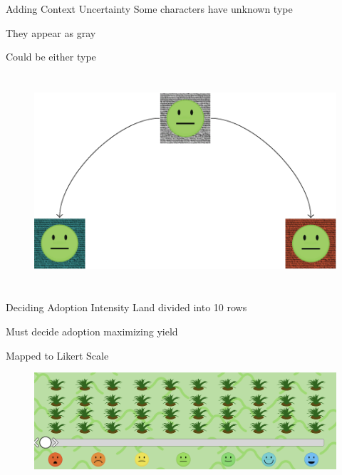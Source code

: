\documentclass[
  ignorenonframetext,
]{beamer}
\begin{document}
\begin{frame}{Adding Context Uncertainty}
\protect\hypertarget{adding-context-uncertainty}{}
Some characters have unknown type

They appear as gray

Could be either type

\begin{figure}

{\centering \includegraphics[width=5.72917in,height=3.125in]{gray_uncertainty.png}

}

\end{figure}
\end{frame}

\begin{frame}{Deciding Adoption Intensity}
\protect\hypertarget{deciding-adoption-intensity}{}
Land divided into 10 rows

Must decide adoption maximizing yield

Mapped to Likert Scale

\begin{figure}

{\centering \includegraphics{adoption_choice.png}

}

\end{figure}
\end{frame}
\end{document}
